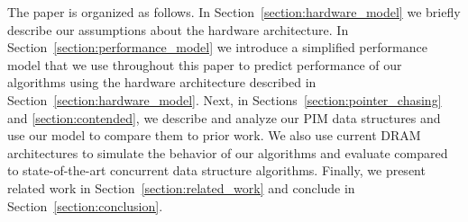 The paper is organized as follows. In Section~\ref{section:hardware_model} we briefly describe 
our assumptions about the hardware architecture. 
In Section~\ref{section:performance_model} we introduce a simplified performance model 
that we use throughout this paper to predict performance of our algorithms using the hardware 
architecture described in Section~\ref{section:hardware_model}. 
Next, in Sections~\ref{section:pointer_chasing} and \ref{section:contended}, 
we describe and analyze our PIM data structures and use our model to compare them to prior work. 
We also use current DRAM architectures to simulate the behavior of our algorithms and 
evaluate compared to state-of-the-art concurrent data structure algorithms. 
Finally, we present related work in Section~\ref{section:related_work} 
and conclude in Section~\ref{section:conclusion}. 

